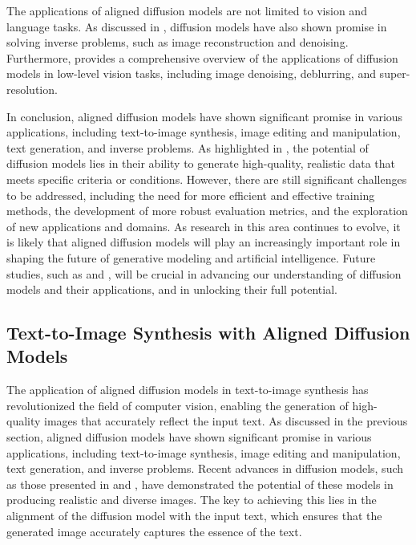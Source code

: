 \documentclass[11pt,a4paper]{article}
\begin{document}
The applications of aligned diffusion models are not limited to vision and language tasks. As discussed in \cite{arxiv:2410.00083}, diffusion models have also shown promise in solving inverse problems, such as image reconstruction and denoising. Furthermore, \cite{doi:10.1109/tpami.2025.3545047} provides a comprehensive overview of the applications of diffusion models in low-level vision tasks, including image denoising, deblurring, and super-resolution.

In conclusion, aligned diffusion models have shown significant promise in various applications, including text-to-image synthesis, image editing and manipulation, text generation, and inverse problems. As highlighted in \cite{arxiv:2402.16369}, the potential of diffusion models lies in their ability to generate high-quality, realistic data that meets specific criteria or conditions. However, there are still significant challenges to be addressed, including the need for more efficient and effective training methods, the development of more robust evaluation metrics, and the exploration of new applications and domains. As research in this area continues to evolve, it is likely that aligned diffusion models will play an increasingly important role in shaping the future of generative modeling and artificial intelligence. Future studies, such as \cite{arxiv:2404.07946} and \cite{arxiv:2406.05191}, will be crucial in advancing our understanding of diffusion models and their applications, and in unlocking their full potential.


\subsection{Text-to-Image Synthesis with Aligned Diffusion Models}


The application of aligned diffusion models in text-to-image synthesis has revolutionized the field of computer vision, enabling the generation of high-quality images that accurately reflect the input text. As discussed in the previous section, aligned diffusion models have shown significant promise in various applications, including text-to-image synthesis, image editing and manipulation, text generation, and inverse problems. Recent advances in diffusion models, such as those presented in \cite{doi:10.1109/tpami.2023.3261988} and \cite{arxiv:2402.16369}, have demonstrated the potential of these models in producing realistic and diverse images. The key to achieving this lies in the alignment of the diffusion model with the input text, which ensures that the generated image accurately captures the essence of the text.
\end{document}
